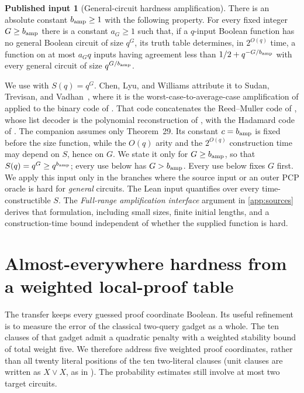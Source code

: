 \documentclass[11pt,letterpaper]{article}
\theoremstyle{definition}
\newtheorem{import}[theorem]{Published input}
\theoremstyle{remark}
\begin{document}
\begin{import}[General-circuit hardness amplification]
\label{imp:ae-amplification}
There is an absolute constant \(b_{\rm amp}\ge1\) with the following
property. For every fixed integer \(G\ge b_{\rm amp}\) there is a constant
\(a_G\ge1\) such that, if a \(q\)-input Boolean function has no general
Boolean circuit of size \(q^G\), its truth table determines, in
\(2^{O(q)}\) time, a function on at most \(a_Gq\) inputs having agreement
less than \(1/2+q^{-G/b_{\rm amp}}\) with every general circuit of size
\(q^{G/b_{\rm amp}}\).
\end{import}
We use \cite[Lemma~3.9]{CLW20} with \(S(q)=q^G\). Chen, Lyu, and Williams
attribute it to Sudan, Trevisan, and Vadhan~\cite{STV01}, where it is the
worst-case-to-average-case amplification of \cite[Theorem~24]{STV01}
applied to the binary code of \cite[Lemma~28]{STV01}. That code
concatenates the Reed--Muller code of \cite[Lemma~25]{STV01}, whose list
decoder is the polynomial reconstruction of \cite[Theorem~29]{STV01},
with the Hadamard code of \cite[Lemma~27]{STV01}. The companion assumes
only Theorem~29. Its constant \(c=b_{\rm amp}\) is fixed
before the size function, while the \(O(q)\) arity and the \(2^{O(q)}\)
construction time may depend on \(S\), hence on \(G\). We state it only
for \(G\ge b_{\rm amp}\), so that \(S(q)=q^G\ge q^{b_{\rm amp}}\);
every use below has \(G>b_{\rm amp}\). Every use below
fixes \(G\) first. We apply this input only in the branches where the
source input or an outer PCP oracle is hard for \emph{general} circuits.
The Lean input quantifies over every time-constructible \(S\).
The \emph{Full-range amplification interface} argument in
\cref{app:sources} derives that formulation, including small sizes,
finite initial lengths, and a construction-time bound independent of
whether the supplied function is hard.


\section{Almost-everywhere hardness from a weighted local-proof table}
\label{sec:gadget-transfer}

The transfer keeps every guessed proof coordinate Boolean. Its useful
refinement is to measure the error of the classical two-query gadget as
a whole. The ten clauses of that gadget admit a quadratic penalty with
a weighted stability bound of total weight five. We therefore address
five weighted proof coordinates, rather than all twenty literal
positions of the ten two-literal clauses (unit clauses are written as
\(X\vee X\), as in \cite[footnote~17]{CW19}). The probability estimates still involve at most two
target circuits.
\end{document}
